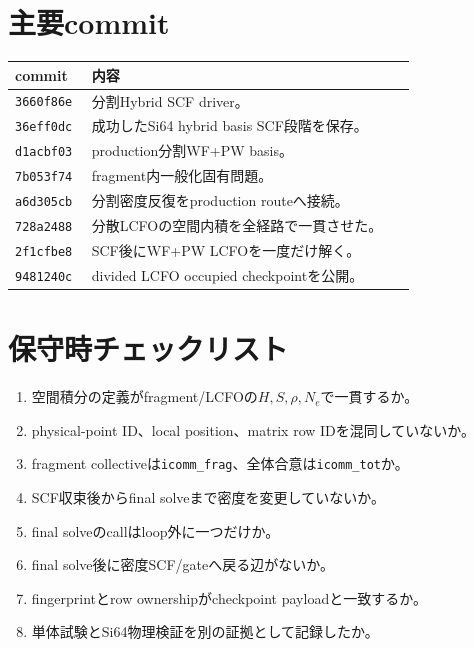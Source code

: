 \documentclass[11pt,a4paper]{article}
\newcommand{\code}[1]{\texttt{#1}}
\begin{document}
\section{主要commit}
\begin{longtable}{@{}p{0.18\linewidth}p{0.76\linewidth}@{}}
\toprule commit & 内容 \\ \midrule
\code{3660f86e} & 分割Hybrid SCF driver。\\
\code{36eff0dc} & 成功したSi64 hybrid basis SCF段階を保存。\\
\code{d1acbf03} & production分割WF+PW basis。\\
\code{7b053f74} & fragment内一般化固有問題。\\
\code{a6d305cb} & 分割密度反復をproduction routeへ接続。\\
\code{728a2488} & 分散LCFOの空間内積を全経路で一貫させた。\\
\code{2f1cfbe8} & SCF後にWF+PW LCFOを一度だけ解く。\\
\code{9481240c} & divided LCFO occupied checkpointを公開。\\
\bottomrule
\end{longtable}

\section{保守時チェックリスト}
\begin{enumerate}
\item 空間積分の定義がfragment/LCFOの$H,S,\rho,N_e$で一貫するか。
\item physical-point ID、local position、matrix row IDを混同していないか。
\item fragment collectiveは\code{icomm\_frag}、全体合意は\code{icomm\_tot}か。
\item SCF収束後からfinal solveまで密度を変更していないか。
\item final solveのcallはloop外に一つだけか。
\item final solve後に密度SCF/gateへ戻る辺がないか。
\item fingerprintとrow ownershipがcheckpoint payloadと一致するか。
\item 単体試験とSi64物理検証を別の証拠として記録したか。
\end{enumerate}
\end{document}
